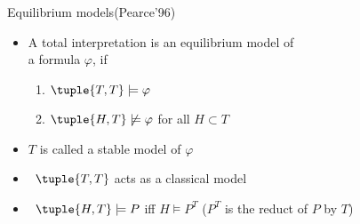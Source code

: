 \begin{frame}{Equilibrium models}{(Pearce'96)}
  \begin{itemize}
  \item A total interpretation  is an \alert{equilibrium model} of\\
    a formula $\varphi$,
    if
    \par
    \smallskip
    \begin{enumerate}\normalsize
    \item
      \(
      \tuple{T,T}\models\varphi
      \)
    \item
      \(
      \tuple{H,T}\not\models\varphi
      \)
      for all $H\subset T$
    \end{enumerate}
    \smallskip
  \item <2-> $T$ is called a \alert{stable model} of $\varphi$
    \bigskip
  \item<3->  \ $\tuple{T,T}$ acts as a classical model
    \smallskip
  \item<4->  \ $\tuple{H,T} \models P$ iff $H \models P^T$ \hfill ($P^T$ is the reduct of $P$ by $T$)
  \end{itemize}
\end{frame}
%
